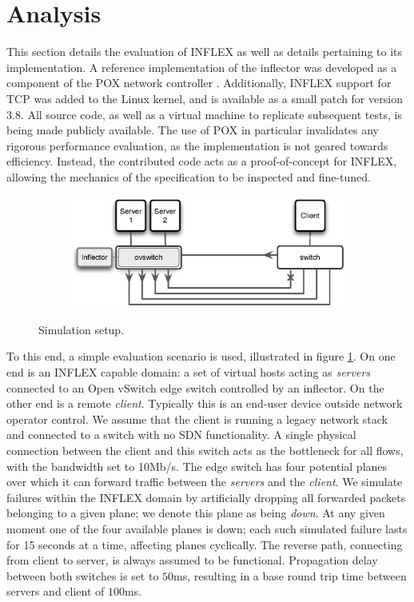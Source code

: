 \section{Analysis}
\label{section:inflex:eval}

This section details the evaluation of INFLEX as well as details pertaining to its implementation.
A reference implementation of the inflector was developed as a component of the POX network controller \cite{pox}.
Additionally, INFLEX support for \ac{TCP} was added to the Linux kernel, and is available as a small patch for version 3.8.
All source code, as well as a virtual machine to replicate subsequent tests, is being made publicly available.
The use of POX in particular invalidates any rigorous performance evaluation, as the implementation is not geared towards efficiency.
Instead, the contributed code acts as a proof-of-concept for INFLEX, allowing the mechanics of the specification to be inspected and fine-tuned.

\begin{figure}
    \begin{subfigure}[b]{1.0\linewidth}
        \centering
        \includegraphics[width=4.0in]{figures/inflex/simtopo.eps}
    \end{subfigure}%
    \caption{Simulation setup. \label{fig:simtopo}}
\end{figure}

To this end, a simple evaluation scenario is used, illustrated in figure \ref{fig:simtopo}.
On one end is an INFLEX capable domain: a set of virtual hosts acting as \emph{servers} connected to an Open vSwitch edge switch controlled by an inflector.
On the other end is a remote \emph{client}.
Typically this is an end-user device outside network operator control. We assume that the client is running a legacy network stack and connected to a switch with no \ac{SDN} functionality.
A single physical connection between the client and this switch acts as the bottleneck for all flows, with the bandwidth set to 10Mb/s. The edge switch has four potential planes over which it can forward traffic between the \emph{servers} and the \emph{client}. We simulate failures within the INFLEX domain by artificially dropping all forwarded packets belonging to a given plane; we denote this plane as being \emph{down}. At any given moment one of the four available planes is down; each such simulated failure lasts for 15 seconds at a time, affecting planes cyclically.
The reverse path, connecting from client to server, is always assumed to be functional.
Propagation delay between both switches is set to $50$ms, resulting in a base round trip time between servers and client of $100$ms.

